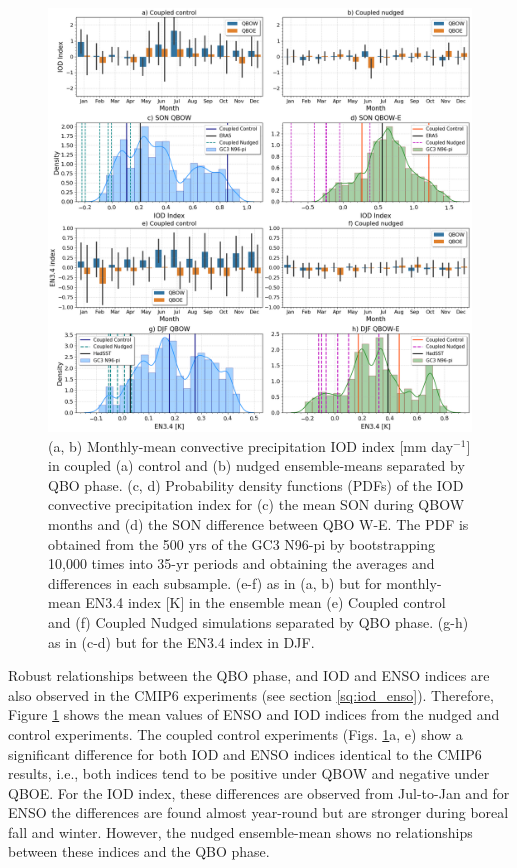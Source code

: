 \begin{figure}[t!]
\centering
 \includegraphics[width=0.97\linewidth]{figures/iod_suites.png}
\caption[IOD and ENSO indices in nudged versus control experiments]{(a, b) Monthly-mean convective precipitation IOD index [mm day$^{-1}$] in coupled (a) control and (b) nudged ensemble-means separated by QBO phase. (c, d) Probability density functions (PDFs) of the IOD convective precipitation index for (c) the mean SON during QBOW months and (d) the SON difference between QBO W-E. The PDF is obtained from the 500 yrs of the GC3 N96-pi by bootstrapping 10,000 times into 35-yr periods and obtaining the averages and differences in each subsample. (e-f) as in (a, b) but for monthly-mean EN3.4 index [K] in the ensemble mean (e) Coupled control and (f) Coupled Nudged simulations separated by QBO phase. (g-h) as in (c-d) but for the EN3.4 index in DJF. }
\label{fig:iod_suites}
\end{figure}

Robust relationships between the QBO phase, and IOD and ENSO indices are also observed in the CMIP6 experiments  (see section \ref{sq:iod_enso}). Therefore, Figure \ref{fig:iod_suites} shows the mean values of ENSO 
and IOD indices from the nudged and control experiments. The coupled control experiments (Figs. \ref{fig:iod_suites}a, e) show a significant difference for both IOD and ENSO indices identical to the CMIP6 results, i.e., both indices tend to be positive under QBOW and negative under QBOE. For the IOD index, these differences are observed from Jul-to-Jan and for ENSO the differences are found almost year-round but are stronger during boreal fall and winter. However, the nudged ensemble-mean shows no relationships between these indices and the QBO phase. 


